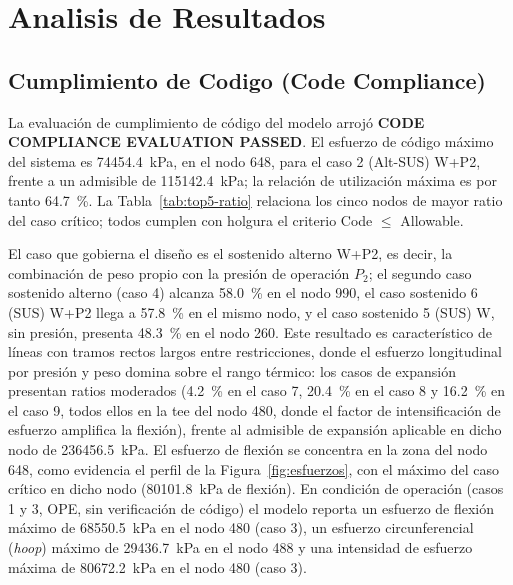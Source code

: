 \section{Analisis de Resultados}
\label{sec:analisis}

\subsection{Cumplimiento de Codigo (Code Compliance)}

La evaluaci\'{o}n de cumplimiento de c\'{o}digo del modelo arroj\'{o}
\textbf{CODE COMPLIANCE EVALUATION PASSED}. El esfuerzo de c\'{o}digo
m\'{a}ximo del sistema es \num{74454.4}~\si{kPa}, en el nodo 648, para el caso
2 (Alt-SUS) W+P2, frente a un admisible de \num{115142.4}~\si{kPa}; la
relaci\'{o}n de utilizaci\'{o}n m\'{a}xima es por tanto 64.7~\%. La
Tabla~\ref{tab:top5-ratio} relaciona los cinco nodos de mayor ratio del caso
cr\'{i}tico; todos cumplen con holgura el criterio Code $\leq$ Allowable.



El caso que gobierna el dise\~{n}o es el sostenido alterno W+P2, es decir, la
combinaci\'{o}n de peso propio con la presi\'{o}n de operaci\'{o}n $P_2$; el
segundo caso sostenido alterno (caso 4) alcanza 58.0~\% en el nodo 990, el caso
sostenido 6 (SUS) W+P2 llega a 57.8~\% en el mismo nodo, y el caso sostenido 5
(SUS) W, sin presi\'{o}n, presenta 48.3~\% en el nodo 260. Este resultado es
caracter\'{i}stico de l\'{i}neas con tramos rectos largos entre restricciones,
donde el esfuerzo longitudinal por presi\'{o}n y peso domina sobre el rango
t\'{e}rmico: los casos de expansi\'{o}n presentan ratios moderados (4.2~\% en el
caso 7, 20.4~\% en el caso 8 y 16.2~\% en el caso 9, todos ellos en la tee del
nodo 480, donde el factor de intensificaci\'{o}n de esfuerzo amplifica la
flexi\'{o}n), frente al admisible de expansi\'{o}n aplicable en dicho nodo de
\num{236456.5}~\si{kPa}. El esfuerzo de flexi\'{o}n se concentra en la zona del
nodo 648, como evidencia el perfil de la Figura~\ref{fig:esfuerzos}, con el
m\'{a}ximo del caso cr\'{i}tico en dicho nodo (\num{80101.8}~\si{kPa} de
flexi\'{o}n). En condici\'{o}n de operaci\'{o}n (casos 1 y 3, OPE, sin
verificaci\'{o}n de c\'{o}digo) el modelo reporta un esfuerzo de flexi\'{o}n
m\'{a}ximo de \num{68550.5}~\si{kPa} en el nodo 480 (caso 3), un esfuerzo
circunferencial (\textit{hoop}) m\'{a}ximo de \num{29436.7}~\si{kPa} en el nodo
488 y una intensidad de esfuerzo m\'{a}xima de \num{80672.2}~\si{kPa} en el
nodo 480 (caso 3).

